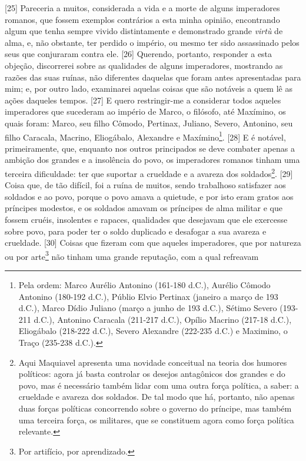 {[}25{]} Pareceria a muitos, considerada a vida e a morte de alguns
imperadores romanos, que fossem exemplos contrários a esta minha
opinião, encontrando algum que tenha sempre vivido distintamente e
demonstrado grande \emph{virtù} de alma, e, não obstante, ter perdido o
império, ou mesmo ter sido assassinado pelos seus que conjuraram contra
ele. {[}26{]} Querendo, portanto, responder a esta objeção, discorrerei
sobre as qualidades de alguns imperadores, mostrando as razões das suas
ruínas, não diferentes daquelas que foram antes apresentadas para mim;
e, por outro lado, examinarei aquelas coisas que são notáveis a quem lê
as ações daqueles tempos. {[}27{]} E quero restringir-me a considerar
todos aqueles imperadores que sucederam ao império de Marco, o filósofo,
até Maxímino, os quais foram: Marco, seu filho Cômodo, Pertinax,
Juliano, Severo, Antonino, seu filho Caracala, Macrino, Eliogábalo,
Alexandre e Maxímino\footnote{Pela ordem: Marco Aurélio Antonino
  (161-180 d.C.), Aurélio Cômodo Antonino (180-192 d.C.), Públio Elvio
  Pertinax (janeiro a março de 193 d.C.), Marco Dídio Juliano (março a
  junho de 193 d.C.), Sétimo Severo (193-211 d.C.), Antonino Caracala
  (211-217 d.C.), Opílio Macrino (217-18 d.C.), Eliogábalo (218-222
  d.C.), Severo Alexandre (222-235 d.C.) e Maximino, o Traço (235-238
  d.C.).}. {[}28{]} E é notável, primeiramente, que, enquanto nos outros
principados se deve combater apenas a ambição dos grandes e a insolência
do povo, os imperadores romanos tinham uma terceira dificuldade: ter que
suportar a crueldade e a avareza dos soldados\footnote{Aqui Maquiavel
  apresenta uma novidade conceitual na teoria dos humores políticos:
  agora já basta controlar os desejos antagônicos dos grandes e do povo,
  mas é necessário também lidar com uma outra força política, a saber: a
  crueldade e avareza dos soldados. De tal modo que há, portanto, não
  apenas duas forças políticas concorrendo sobre o governo do príncipe,
  mas também uma terceira força, os militares, que se constituem agora
  como força política relevante.}. {[}29{]} Coisa que, de tão difícil,
foi a ruína de muitos, sendo trabalhoso satisfazer aos soldados e ao
povo, porque o povo amava a quietude, e por isto eram gratos aos
príncipes modestos, e os soldados amavam os príncipes de alma militar e
que fossem cruéis, insolentes e rapaces, qualidades que desejavam que
ele exercesse sobre povo, para poder ter o soldo duplicado e desafogar a
sua avareza e crueldade. {[}30{]} Coisas que fizeram com que aqueles
imperadores, que por natureza ou por arte\footnote{Por artifício, por
  aprendizado.} não tinham uma grande reputação, com a qual refreavam
